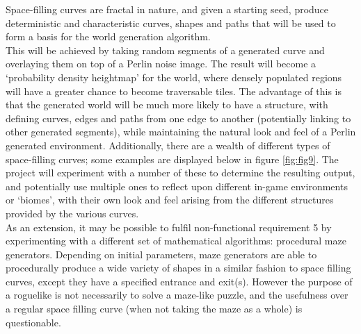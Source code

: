 \documentclass[12pt,a4paper]{article}
\begin{document}
Space-filling curves are fractal in nature, and given a starting seed, produce deterministic and characteristic curves, shapes and paths that will be used to form a basis for the world generation algorithm.\\

This will be achieved by taking random segments of a generated curve and overlaying them on top of a Perlin noise image. The result will become a `probability density heightmap' for the world, where densely populated regions will have a greater chance to become traversable tiles. The advantage of this is that the generated world will be much more likely to have a structure, with defining curves, edges and paths from one edge to another (potentially linking to other generated segments), while maintaining the natural look and feel of a Perlin generated environment. Additionally, there are a wealth of different types of space-filling curves; some examples are displayed below in figure \ref{fig:fig9}. The project will experiment with a number of these to determine the resulting output, and potentially use multiple ones to reflect upon different in-game environments or `biomes', with their own look and feel arising from the different structures provided by the various curves. \\

As an extension, it may be possible to fulfil non-functional requirement 5 by experimenting with a different set of mathematical algorithms: procedural maze generators. Depending on initial parameters, maze generators are able to procedurally produce a wide variety of shapes in a similar fashion to space filling curves, except they have a specified entrance and exit(s). However the purpose of a roguelike is not necessarily to solve a maze-like puzzle, and the usefulness over a regular space filling curve (when not taking the maze as a whole) is questionable.
\end{document}
